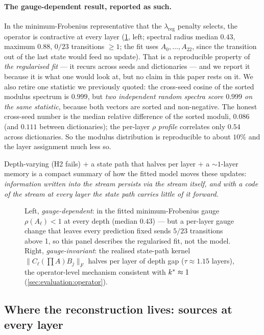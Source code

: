 \paragraph{The gauge-dependent result, reported as such.}
In the minimum-Frobenius representative that the $\lambda_{\mathrm{reg}}$
penalty selects, the operator is contractive at every layer
(\cref{fig:spectrum}, left; spectral radius
median $0.43$, maximum $0.88$, $0/23$ transitions $\ge 1$; the fit uses
$A_0,\dots,A_{22}$, since the transition out of the last state would feed no
update). That is a reproducible property of \emph{the regularised fit} --- it
recurs across seeds and dictionaries --- and we report it because it is what
one would look at, but no claim in this paper rests on it. We also retire one
statistic we previously quoted: the cross-seed cosine of the sorted modulus
spectrum is $0.999$, but \emph{two independent random spectra score $0.999$ on
the same statistic}, because both vectors are sorted and non-negative. The
honest cross-seed number is the median relative difference of the sorted
moduli, $\mathbf{0.086}$ (and $0.111$ between dictionaries); the per-layer
$\rho$ \emph{profile} correlates only $0.54$ across dictionaries. So the
modulus distribution is reproducible to about $10\%$ and the layer assignment
much less so.

Depth-varying (H2 fails) $+$ a state path that halves per layer $+$ a
${\sim}1$-layer memory is a compact summary of how the fitted model moves
these updates: \emph{information written into the stream persists via the
stream itself, and with a code of the stream at every layer the state path
carries little of it forward.}

\begin{figure}[t]
  \centering
  
  \caption{Left, \emph{gauge-dependent}: in the fitted minimum-Frobenius gauge
  $\rho(A_\ell) < 1$ at every depth (median $0.43$) --- but a per-layer gauge
  change that leaves every prediction fixed sends $5/23$ transitions above 1,
  so this panel describes the regularised fit, not the model. Right,
  \emph{gauge-invariant}: the realised state-path kernel
  $\|C_\ell (\prod A) B_j\|_F$ halves per layer of depth gap ($\tau \approx
  1.15$ layers), the operator-level mechanism consistent with $k^{\ast} \approx
  1$ (\cref{sec:evaluation:operator}).}
  \label{fig:spectrum}
\end{figure}

\subsection{Where the reconstruction lives: sources at every layer}
\label{sec:evaluation:prefix}

